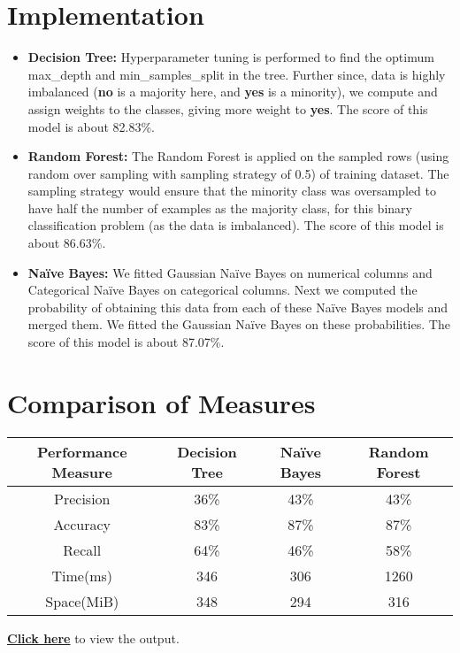 \documentclass{article}
\begin{document}
\section{Implementation}
\begin{itemize}
\item \textbf{Decision Tree:}
Hyperparameter tuning is performed to find the optimum max\_depth and min\_samples\_split in the tree. Further since, data is highly imbalanced (\textbf{no} is a majority here, and \textbf{yes} is a minority), 
we compute and assign weights to the classes, giving more weight to \textbf{yes}. The score of this model is about 82.83\%. 
\item \textbf{Random Forest:} The Random Forest is applied on the sampled rows (using random over sampling with sampling strategy of 0.5) of training dataset. The sampling strategy would ensure that the minority class was oversampled to have half the number of examples as the majority class, for this binary classification problem (as the data is imbalanced). The score of this model is about 86.63\%.
\item \textbf{Naïve Bayes:} We fitted Gaussian Naïve Bayes on numerical columns and Categorical Naïve Bayes on categorical columns. Next we computed the probability of obtaining this data from each of these Naïve Bayes models and merged them. We fitted the Gaussian Naïve Bayes on these probabilities. The score of this model is about 87.07\%.
\end{itemize}
\maketitle
\section{Comparison of Measures}
\begin{center}
\begin{tabular}{ |c|c|c|c| } 
 \hline
 \textbf{Performance Measure} & \textbf{Decision Tree} & \textbf{Naïve Bayes} & \textbf{Random Forest} \\
 \hline
 Precision & 36\% & 43\% & 43\%\\
 \hline
 Accuracy & 83\% & 87\% & 87\% \\
 \hline
Recall & 64\% & 46\% & 58\% \\
\hline
 Time(ms) & 346 & 306 & 1260 \\
\hline
 Space(MiB) & 348 & 294 & 316 \\
 \hline
\end{tabular}
\end{center}
\href{https://drive.google.com/drive/folders/1OyzkKjy7UCJ0wfkkDQKBc2BCuInMIrXG?usp=sharing}{\textbf{Click here}} to view the output.
\maketitle
\end{document}
